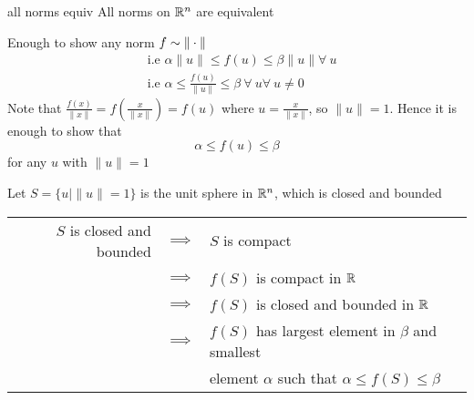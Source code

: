 \begin{Theorem}{}{all norms equiv}
	All norms on $\mathbb{R}^n$ are equivalent
\end{Theorem}
\begin{myproof}
	Enough to show any norm $f \sim \|\cdot\|$  \begin{align*}
		 & \text{i.e }\alpha \|u\|\leq f(u)\leq \beta\|u\| \forall\ u                        \\
		 & \text{i.e } \alpha \leq \frac{f(u)}{\|u\|}\leq \beta\ \forall\ u \forall\ u\neq 0
	\end{align*}
	Note that $\frac{f(x)}{\|x\|}=f\left(\frac{x}{\|x\|}\right)=f(u)$ where $u=\frac{x}{\|x\|}$, so $\|u\|=1$. Hence it is enough to show that $$\alpha\leq f(u)\leq \beta$$for any $u$ with $\|u\|=1$

	Let $S=\{u\mid \|u\|=1\}$ is the unit sphere in $\mathbb{R}^n$, which is closed and bounded

	\begin{center}
		\begin{tabular}{rcl}
			$S$ is closed and bounded & $\implies$ & $S$ is compact                                        \\
			                          & $\implies$ & $f(S)$ is compact in $\mathbb{R}$                           \\
			                          & $\implies$ & $f(S)$ is closed and bounded in $\mathbb{R}$                \\
			                          & $\implies$ & $f(S)$ has largest element in $\beta$ and smallest    \\
			                          &            & element $\alpha$ such that $\alpha\leq f(S)\leq\beta$
		\end{tabular}
	\end{center}
\end{myproof}


